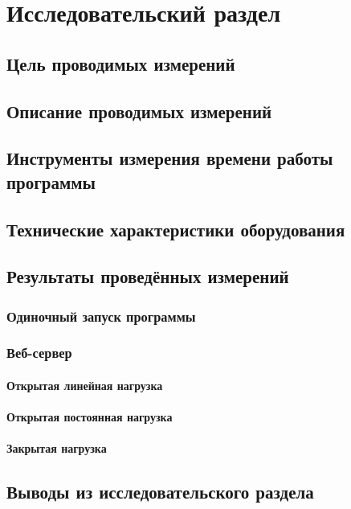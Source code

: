 \chapter{Исследовательский раздел}



\section{Цель проводимых измерений}



\section{Описание проводимых измерений}



\section{Инструменты измерения времени работы программы}



\section{Технические характеристики оборудования}



\section{Результаты проведённых измерений}

\subsection{Одиночный запуск программы}

\subsection{Веб-сервер}

\subsubsection{Открытая линейная нагрузка}

\subsubsection{Открытая постоянная нагрузка}

\subsubsection{Закрытая нагрузка}



\section*{Выводы из исследовательского раздела}

